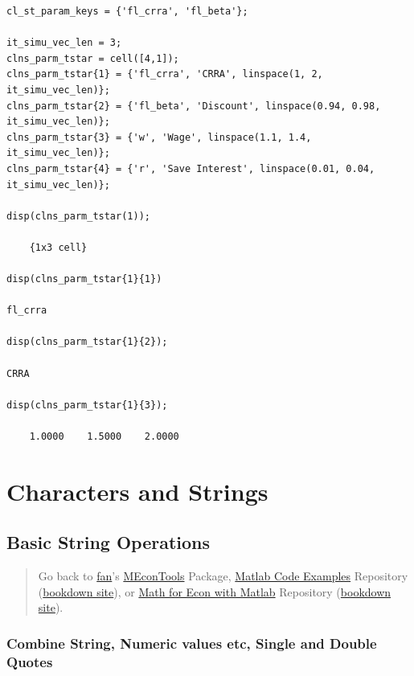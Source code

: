 \documentclass[
]{book}
\begin{document}
\begin{verbatim}
cl_st_param_keys = {'fl_crra', 'fl_beta'};

it_simu_vec_len = 3;
clns_parm_tstar = cell([4,1]);
clns_parm_tstar{1} = {'fl_crra', 'CRRA', linspace(1, 2, it_simu_vec_len)};
clns_parm_tstar{2} = {'fl_beta', 'Discount', linspace(0.94, 0.98, it_simu_vec_len)};
clns_parm_tstar{3} = {'w', 'Wage', linspace(1.1, 1.4, it_simu_vec_len)};
clns_parm_tstar{4} = {'r', 'Save Interest', linspace(0.01, 0.04, it_simu_vec_len)};

disp(clns_parm_tstar(1));

    {1x3 cell}

disp(clns_parm_tstar{1}{1})

fl_crra

disp(clns_parm_tstar{1}{2});

CRRA

disp(clns_parm_tstar{1}{3});

    1.0000    1.5000    2.0000
\end{verbatim}

\hypertarget{characters-and-strings}{%
\section{Characters and Strings}\label{characters-and-strings}}

\hypertarget{basic-string-operations}{%
\subsection{Basic String Operations}\label{basic-string-operations}}

\begin{quote}
Go back to \href{http://fanwangecon.github.io/}{fan}'s \href{https://fanwangecon.github.io/MEconTools/}{MEconTools} Package, \href{https://fanwangecon.github.io/M4Econ/}{Matlab Code Examples} Repository (\href{https://fanwangecon.github.io/M4Econ/bookdown}{bookdown site}), or \href{https://fanwangecon.github.io/Math4Econ/}{Math for Econ with Matlab} Repository (\href{https://fanwangecon.github.io/Math4Econ/bookdown}{bookdown site}).
\end{quote}

\hypertarget{combine-string-numeric-values-etc-single-and-double-quotes}{%
\subsubsection{Combine String, Numeric values etc, Single and Double Quotes}\label{combine-string-numeric-values-etc-single-and-double-quotes}}
\end{document}
